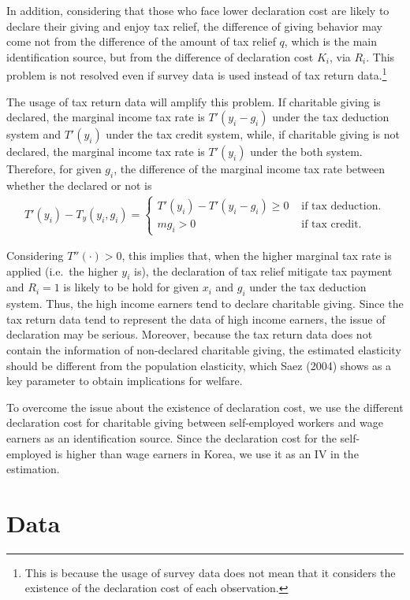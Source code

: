 \documentclass[
  11pt,
  a4paper,
]{article}
\begin{document}
In addition, considering that those who face lower declaration cost are likely to declare their giving and enjoy tax relief, the difference of giving behavior may come not from the difference of the amount of tax relief \(q\), which is the main identification source, but from the difference of declaration cost \(K_i\), via \(R_i\).
This problem is not resolved even if survey data is used instead of tax return data.\footnote{This is because the usage of survey data does not mean that it considers the existence of the declaration cost of each observation.}

The usage of tax return data will amplify this problem. If charitable giving is declared, the marginal income tax rate is \(T'(y_i-g_i)\) under the tax deduction system and \(T'(y_i)\) under the tax credit system, while, if charitable giving is not declared, the marginal income tax rate is \(T'(y_i)\) under the both system. Therefore, for given \(g_i\), the difference of the marginal income tax rate between whether the declared or not is
\begin{align}
T'(y_i)-T_y(y_i,g_i)=\begin{cases}
    T'(y_i)-T'(y_i-g_i)\ge0 &\text{ if tax deduction}.\\
    mg_i>0 &\text{ if tax credit}.
\end{cases}
\end{align}

Considering \(T''(\cdot)>0\), this implies that, when the higher marginal tax rate is applied (i.e.~the higher \(y_i\) is), the declaration of tax relief mitigate tax payment and \(R_i=1\) is likely to be hold for given \(x_i\) and \(g_i\) under the tax deduction system. Thus, the high income earners tend to declare charitable giving. Since the tax return data tend to represent the data of high income earners, the issue of declaration may be serious. Moreover, because the tax return data does not contain the information of non-declared charitable giving, the estimated elasticity should be different from the population elasticity, which Saez (2004) shows as a key parameter to obtain implications for welfare.

To overcome the issue about the existence of declaration cost, we use the different declaration cost for charitable giving between self-employed workers and wage earners as an identification source. Since the declaration cost for the self-employed is higher than wage earners in Korea, we use it as an IV in the estimation.

\hypertarget{data}{%
\section{Data}\label{data}}
\end{document}
